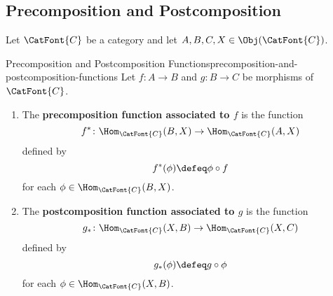 \subsection{Precomposition and Postcomposition}\label{subsection-precomposition-and-postcomposition}
Let $\CatFont{C}$ be a category and let $A,B,C,X\in\Obj(\CatFont{C})$.
\begin{definition}{Precomposition and Postcomposition Functions}{precomposition-and-postcomposition-functions}%
    Let $f\colon A\to B$ and $g\colon B\to C$ be morphisms of $\CatFont{C}$.
    \begin{enumerate}
        \item\label{precomposition-and-postcomposition-functions-precomposition}The \textbf{precomposition function associated to $f$} is the function%
            \[
                f^{*}
                \colon
                \Hom_{\CatFont{C}}(B,X)
                \to
                \Hom_{\CatFont{C}}(A,X)
            \]%
            defined by
            \[
                f^{*}(\phi)
                \defeq
                \phi\circ f
            \]%
            for each $\phi\in\Hom_{\CatFont{C}}(B,X)$.
        \item\label{precomposition-and-postcomposition-functions-postcomposition}The \textbf{postcomposition function associated to $g$} is the function%
            \[
                g_{*}
                \colon
                \Hom_{\CatFont{C}}(X,B)
                \to
                \Hom_{\CatFont{C}}(X,C)
            \]%
            defined by
            \[
                g_{*}(\phi)
                \defeq
                g\circ\phi
            \]%
            for each $\phi\in\Hom_{\CatFont{C}}(X,B)$.
    \end{enumerate}
\end{definition}
